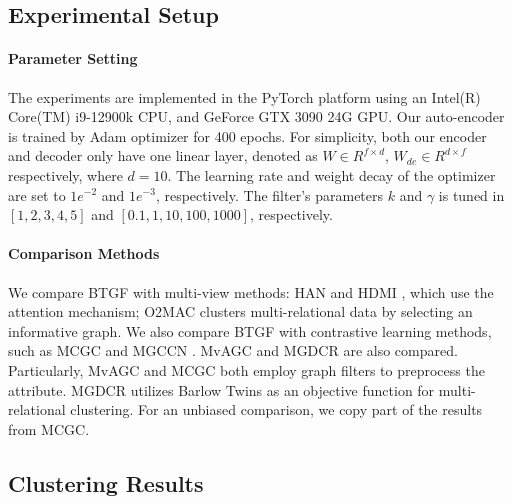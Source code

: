 \documentclass[letterpaper]{article} %
\begin{document}
\subsection{Experimental Setup}
{
\setlength{\parindent}{0cm}
\paragraph{\bf{Parameter Setting}}The experiments are implemented in the PyTorch platform
using an Intel(R) Core(TM) i9-12900k CPU, and GeForce GTX 3090 24G GPU.
Our auto-encoder is trained by Adam optimizer \cite{kingma2017adam} for 400 epochs. 
For simplicity, both our encoder and decoder only have one linear layer, denoted as $W \in R^{f \times d}$, $W_{de} \in R^{d\times f}$ respectively, where $d=10$.
The learning rate and weight decay of the optimizer are set to $1e^{-2}$ and $1e^{-3}$, respectively. The filter's parameters $k$ and $\gamma$ is tuned in $[1,2,3,4,5]$ and $[0.1,1,10,100,1000]$, respectively.
}
{
\setlength{\parindent}{0cm}
\paragraph{\bf{Comparison Methods}}We compare BTGF with multi-view methods: HAN \cite{10.1145/3308558.3313562} and HDMI \cite{jing2021hdmi}, which use the attention mechanism; O2MAC \cite{fan2020one2multi} clusters multi-relational data by selecting an informative graph. We also compare BTGF with contrastive learning methods, such as MCGC \cite{pan2021multi} and MGCCN \cite{10.1016/j.ins.2022.09.042}. MvAGC \cite{lin2021graph} and MGDCR \cite{mo2023multiplex} are also compared. Particularly, MvAGC and MCGC both employ graph filters to preprocess the attribute. MGDCR utilizes Barlow Twins as an objective function for multi-relational clustering. For an unbiased comparison, we copy part of the results from MCGC.
}


\subsection{Clustering Results}
\end{document}
